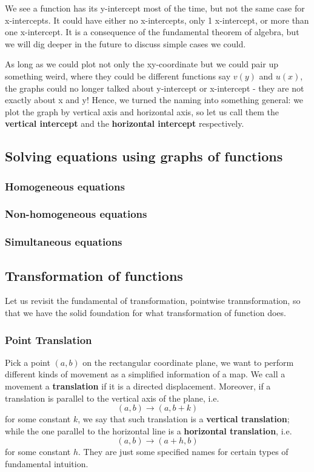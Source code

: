 \documentclass[12pt]{article}
\begin{document}
    We see a function has its y-intercept most of the time, but not the same case for x-intercepts. It could have either no x-intercepts, only 1 x-intercept, or more than one x-intercept. It is a consequence of the fundamental theorem of algebra, but we will dig deeper in the future to discuss simple cases we could.

    As long as we could plot not only the xy-coordinate but we could pair up something weird, where they could be different functions say $v(y)$ and $u(x)$, the graphs could no longer talked about y-intercept or x-intercept - they are not exactly about x and y! Hence, we turned the naming into something general: we plot the graph by vertical axis and horizontal axis, so let us call them the \textbf{vertical intercept} and the \textbf{horizontal intercept} respectively.

    \subsection{Solving equations using graphs of functions}

    \subsubsection*{Homogeneous equations}

    \subsubsection*{Non-homogeneous equations}

    \subsubsection*{Simultaneous equations}

    \subsection{Transformation of functions}

    Let us revisit the fundamental of transformation, pointwise trannsformation, so that we have the solid foundation for what transformation of function does.

    \subsubsection*{Point Translation}

    Pick a point $(a,b)$ on the rectangular coordinate plane, we want to perform different kinds of movement as a simplified information of a map. We call a movement a \textbf{translation} if it is a directed displacement. Moreover, if a translation is parallel to the vertical axis of the plane, i.e. \[(a,b)\to (a, b+k)\] for some constant $k$, we say that such translation is a \textbf{vertical translation}; while the one parallel to the horizontal line is a \textbf{horizontal translation}, i.e. \[(a,b)\to (a+h, b)\] for some constant $h$. They are just some specified names for certain types of fundamental intuition.
\end{document}
